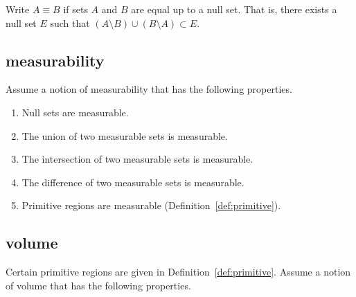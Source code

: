 Write $A\equiv B$ if sets $A$ and $B$ are equal up to a null set.
That is, there exists a null set $E$ such that
   $(A\setminus B) \cup (B\setminus A) \subset E$.

\subsection{measurability}\label{sec:measure}

Assume a notion of measurability that has the following properties.

\begin{enumerate}%
 \item Null sets are measurable.\\
 \item The union of two measurable sets is measurable.\\
 \item The intersection of two measurable sets is measurable.\\
 \item The difference of two measurable sets is measurable.\\
 \item Primitive regions are measurable (Definition~\ref{def:primitive}).
\end{enumerate}

\subsection{volume}\label{sec:volume}

Certain primitive regions are given in Definition~\ref{def:primitive}.
Assume a notion of volume that has the following properties.


